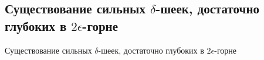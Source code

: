 \subsection{\texorpdfstring{Существование сильных $\delta$-шеек, достаточно глубоких в $2\epsilon$-горне}{Существование сильных δ-шеек, достаточно глубоких в 2ϵ-горне}}
Существование сильных $\delta$-шеек, достаточно глубоких в $2\epsilon$-горне